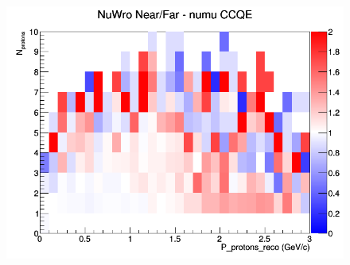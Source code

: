 \begin{figure}[h]
\endminipage
{}
\includegraphics[width=\linewidth]{eff_N_P/LAr/protons/ratios/CCQE_NuWro_numu_NF_N_P.png}
\endminipage
\newline
\end{figure}
\clearpage
